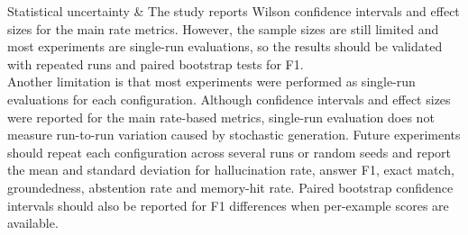 Statistical uncertainty & The study reports Wilson confidence intervals and effect
sizes for the main rate metrics. However, the sample sizes are still limited and most
experiments are single-run evaluations, so the results should be validated with
repeated runs and paired bootstrap tests for F1. \\

Another limitation is that most experiments were performed as single-run
evaluations for each configuration. Although confidence intervals and effect sizes
were reported for the main rate-based metrics, single-run evaluation does not
measure run-to-run variation caused by stochastic generation. Future experiments
should repeat each configuration across several runs or random seeds and report
the mean and standard deviation for hallucination rate, answer F1, exact match,
groundedness, abstention rate and memory-hit rate. Paired bootstrap confidence
intervals should also be reported for F1 differences when per-example scores are
available.
